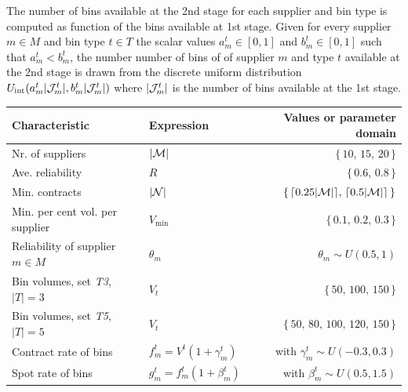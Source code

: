 \documentclass[a4paper,11pt]{article}
\begin{document}
{	The number of bins available at the 2nd stage for each supplier and bin type is computed as function of the bins available at 1st stage.
	Given for every supplier $ m \in M$ and bin type $ t \in T$ the scalar values $ a^t_m \in [0,1]$ and $ b^t_m \in [0,1]$ such that $ a^t_m < b^t_m$, the number number of bins of  of supplier $ m$ and type $ t$ available at the 2nd stage is drawn from the discrete uniform distribution $ U_{\text{int}}( a^t_m | {\cal J}^t_m |, b^t_m | {\cal J}^t_m |)$ where $ | {\cal J}^t_m |$ is the number of bins available at the 1st stage.
	}
	\begin{table}[htb!]
		\footnotesize
		\centering
		\begin{tabular}{llr}
			\hline
			Characteristic & Expression & Values or parameter domain \\
			\hline
			Nr. of suppliers                                    & $|{\cal M}| $                           & $ \{ \, 10, \, 15, \, 20 \, \}$ \\
			Ave. reliability                                    & $R $                                    & $ \{\, 0.6, \, 0.8 \, \}$ \\
			Min. contracts                                      & $|{\cal N}| $                           & $ \{ \, \lceil 0.25 |{\cal M}| \rceil, \, \lceil 0.5 |{\cal M}| \rceil \, \}$ \\
			Min. per cent vol. per supplier                     & $V_{\text{min}}$                        & $  \{\, 0.1, \, 0.2, \, 0.3 \,\}$ \\
			Reliability of supplier $ m \in M$                  & $\theta_{m}$                            & $ \theta_{m} \sim U(0.5, 1)$ \\
			
			Bin volumes, set \textit{T3},       $ |T| = 3 $     & $ V_t          $                        & $ \{ \, 50, \, 100, \, 150 \, \}$ \\
			Bin volumes, set \textit{T5},       $ |T| = 5 $     & $ V_t          $                        & $ \{ \, 50, \, 80, \, 100, \, 120, \, 150 \, \}$ \\
			
			Contract rate of bins                               & $f^t_m =    V^t (1 + \gamma^t_m)$       & with $\gamma^t_m \sim U(-0.3,0.3)$  \\
			Spot rate of bins                                   & $g^t_m = f^t_m (1 + \beta^t_m) $        & with $\beta^t_m \sim U(0.5, 1.5)$  \\


\end{tabular}
\end{table}
\end{document}
